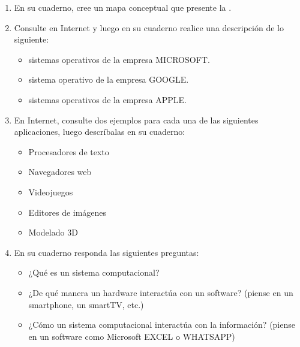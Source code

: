 \documentclass[letterpaper,10pt,spanish]{sphinxmanual}
\begin{document}
\begin{enumerate}
\item {} 
\sphinxAtStartPar
En su cuaderno, cree un mapa conceptual que presente la .

\item {} 
\sphinxAtStartPar
Consulte en Internet y luego en su cuaderno realice una descripción de lo siguiente:
\begin{itemize}
\item {} 
 sistemas operativos de la empresa MICROSOFT.

\item {} 
 sistema operativo de la empresa GOOGLE.

\item {} 
 sistemas operativos de la empresa APPLE.

\end{itemize}

\item {} 
\sphinxAtStartPar
En Internet, consulte dos ejemplos para cada una de las siguientes aplicaciones, luego descríbalas en su cuaderno:
\begin{itemize}
\item {} 
\sphinxAtStartPar
Procesadores de texto

\item {} 
\sphinxAtStartPar
Navegadores web

\item {} 
\sphinxAtStartPar
Videojuegos

\item {} 
\sphinxAtStartPar
Editores de imágenes

\item {} 
\sphinxAtStartPar
Modelado 3D

\end{itemize}

\item {} 
\sphinxAtStartPar
En su cuaderno responda las siguientes preguntas:
\begin{itemize}
\item {} 
\sphinxAtStartPar
¿Qué es un sistema computacional?

\item {} 
\sphinxAtStartPar
¿De qué manera un hardware interactúa con un software? (piense en un smartphone, un smart\sphinxhyphen{}TV, etc.)

\item {} 
\sphinxAtStartPar
¿Cómo un sistema computacional interactúa con la información? (piense en un software como Microsoft EXCEL o WHATSAPP)


\end{itemize}
\end{enumerate}
\end{document}
